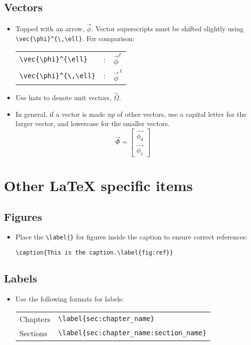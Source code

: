 \documentclass[10pt, letter]{article}
\begin{document}
\begin{multicols}{2}
\subsection{Vectors}
\begin{itemize}
\item Topped with an arrow, $\vec{\phi}$. Vector superscripts must be shifted
slightly using \verb|\vec{\phi}^{\,\ell}|. For comparison:
\begin{center}
  \begin{tabular}[h!]{lcl}
    \verb|\vec{\phi}^{\ell}| & : & $\vec{\phi}^{\ell}$ \\
    \verb|\vec{\phi}^{\,\ell}| & : & $\vec{\phi}^{\,\ell}$
  \end{tabular}
\end{center}
\item Use hats to denote unit vectors, $\hat{\Omega}$.
\item In general, if a vector is made up of other vectors, use a
  capital letter for the larger vector, and lowercase for the smaller
  vectors.
\begin{equation*}
    \vec{\Phi} =
    \begin{bmatrix}
      \vec{\phi_0} \\ \vec{\phi_1}
    \end{bmatrix}
\end{equation*}
\end{itemize}
\end{multicols}
\pagebreak

\section{Other \LaTeX{} specific items}\label{sec:latex}

\subsection{Figures}\label{sec:figures}
\begin{itemize}
\item Place the \verb|\label{}| for figures inside the caption to ensure
  correct references:
\begin{lstlisting}
\caption{This is the caption.\label{fig:ref}}
\end{lstlisting}
\end{itemize}

\subsection{Labels}
\label{sec:labels}
\begin{itemize}
\item Use the following formats for labels:
  \begin{center}
    \begin{tabular}{ll}
      Chapters & \verb|\label{sec:chapter_name}| \\
      Sections & \verb|\label{sec:chapter_name:section_name}|
    \end{tabular}
  \end{center}
\end{itemize}
\end{document}
